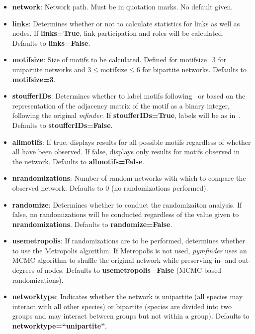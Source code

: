 \documentclass[12pt]{article}
\begin{document}
     	\begin{itemize}

     		\item \textbf{network}: Network path. Must be in quotation marks. No default given.

				\item \textbf{links}: Determines whether or not to calculate statistics for links as well as nodes. If \textbf{links=True}, link participation and roles will be calculated. Defaults to \textbf{links=False}.

				\item \textbf{motifsize}: Size of motifs to be calculated. Defined for motifsize=3 for unipartite networks and 3$\leq$motifsize$\leq$6 for bipartite networks. Defaults to \textbf{motifsize=3}.

				\item \textbf{stoufferIDs}: Determines whether to label motifs following~\citet{Stouffer2007} or based on the representation of the adjacency matrix of the motif as a binary integer, following the original \emph{mfinder}. If \textbf{stoufferIDs=True}, labels will be as in~\citet{Stouffer2007}. Defaults to \textbf{stoufferIDs=False}.

				\item \textbf{allmotifs}: If true, displays results for all possible motifs regardless of whether all have been observed. If false, displays only results for motifs observed in the network. Defaults to \textbf{allmotifs=False}.

				\item \textbf{nrandomizations}: Number of random networks with which to compare the observed network. Defaults to 0 (no randomizations performed).

				\item \textbf{randomize}: Determines whether to conduct the randomizaiton analysis. If false, no randomizations will be conducted regardless of the value given to \textbf{nrandomizations}. Defaults to \textbf{randomize=False}.

				\item \textbf{usemetropolis}: If randomizations are to be performed, determines whether to use the Metropolis algorithm. If Metropolis is not used, \emph{pymfinder} uses an MCMC algorithm to shuffle the original network while preserving in- and out-degrees of nodes. Defaults to \textbf{usemetropolis=False} (MCMC-based randomizations).

				\item \textbf{networktype}: Indicates whether the network is unipartite (all species may interact with all other species) or bipartite (species are divided into two groups and may interact between groups but not within a group). Defaults to \textbf{networktype=``unipartite''}.

			\end{itemize}
\end{document}

